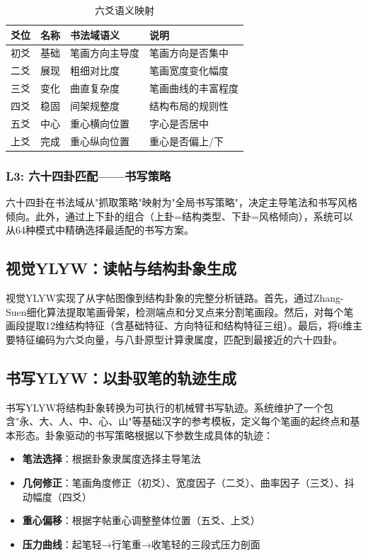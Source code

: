 \documentclass[12pt,a4paper]{article}
\begin{document}
\begin{table}[htbp]
\centering
\caption{六爻语义映射}
\label{tab:yao_mapping}
\begin{tabular}{ccll}
\toprule
爻位 & 名称 & 书法域语义 & 说明 \\
\midrule
初爻 & 基础 & 笔画方向主导度 & 笔画方向是否集中 \\
二爻 & 展现 & 粗细对比度 & 笔画宽度变化幅度 \\
三爻 & 变化 & 曲直复杂度 & 笔画曲线的丰富程度 \\
四爻 & 稳固 & 间架规整度 & 结构布局的规则性 \\
五爻 & 中心 & 重心横向位置 & 字心是否居中 \\
上爻 & 完成 & 重心纵向位置 & 重心是否偏上/下 \\
\bottomrule
\end{tabular}
\end{table}

\subsubsection{L3: 六十四卦匹配——书写策略}

六十四卦在书法域从"抓取策略"映射为"全局书写策略"，决定主导笔法和书写风格倾向。此外，通过上下卦的组合（上卦=结构类型、下卦=风格倾向），系统可以从64种模式中精确选择最适配的书写方案。

\subsection{视觉YLYW：读帖与结构卦象生成}

视觉YLYW实现了从字帖图像到结构卦象的完整分析链路。首先，通过Zhang-Suen细化算法提取笔画骨架，检测端点和分叉点来分割笔画段。然后，对每个笔画段提取12维结构特征（含基础特征、方向特征和结构特征三组）。最后，将6维主要特征编码为六爻向量，与八卦原型计算隶属度，匹配到最接近的六十四卦。

\subsection{书写YLYW：以卦驭笔的轨迹生成}

书写YLYW将结构卦象转换为可执行的机械臂书写轨迹。系统维护了一个包含"永、大、人、中、心、山"等基础汉字的参考模板，定义每个笔画的起终点和基本形态。卦象驱动的书写策略根据以下参数生成具体的轨迹：

\begin{itemize}[nosep]
\item \textbf{笔法选择}：根据卦象隶属度选择主导笔法
\item \textbf{几何修正}：笔画角度修正（初爻）、宽度因子（二爻）、曲率因子（三爻）、抖动幅度（四爻）
\item \textbf{重心偏移}：根据字帖重心调整整体位置（五爻、上爻）
\item \textbf{压力曲线}：起笔轻→行笔重→收笔轻的三段式压力剖面
\end{itemize}
\end{document}
